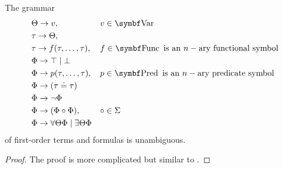\begin{proposition}\label{thm:first_order_formulas_are_unambiguous}
  The grammar
  \begin{equation*}
    \begin{aligned}
      &\Theta \to v,                                          && v \in \Bold{Var} \\
      &\tau \to \Theta,                                       && \\
      &\tau \to f(\tau, \ldots, \tau),                        && f \in \Cat{Func} \text{ is an } n-\text{ary functional symbol} \\
      &\Phi \to \top \;|\; \bot                               && \\
      &\Phi \to p(\tau, \ldots, \tau),                        && p \in \Cat{Pred} \text{ is an } n-\text{ary predicate symbol} \\
      &\Phi \to (\tau \doteq \tau)                            && \\
      &\Phi \to \neg \Phi                                     && \\
      &\Phi \to (\Phi \circ \Phi),                            && \circ \in \Sigma \\
      &\Phi \to \forall \Theta \Phi \;|\; \exists \Theta \Phi && \\
    \end{aligned}
  \end{equation*}
  of first-order terms and formulas is unambiguous.
\end{proposition}
\begin{proof}
  The proof is more complicated but similar to .
\end{proof}

